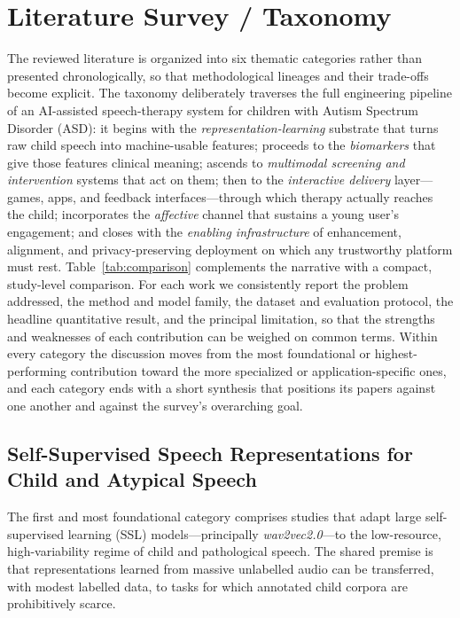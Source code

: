 \documentclass[conference]{IEEEtran}
\begin{document}
\section{Literature Survey / Taxonomy}
\label{sec:survey}
The reviewed literature is organized into six thematic categories rather than presented chronologically, so that methodological lineages and their trade-offs become explicit. The taxonomy deliberately traverses the full engineering pipeline of an AI-assisted speech-therapy system for children with Autism Spectrum Disorder (ASD): it begins with the \emph{representation-learning} substrate that turns raw child speech into machine-usable features; proceeds to the \emph{biomarkers} that give those features clinical meaning; ascends to \emph{multimodal screening and intervention} systems that act on them; then to the \emph{interactive delivery} layer---games, apps, and feedback interfaces---through which therapy actually reaches the child; incorporates the \emph{affective} channel that sustains a young user's engagement; and closes with the \emph{enabling infrastructure} of enhancement, alignment, and privacy-preserving deployment on which any trustworthy platform must rest. Table~\ref{tab:comparison} complements the narrative with a compact, study-level comparison. For each work we consistently report the problem addressed, the method and model family, the dataset and evaluation protocol, the headline quantitative result, and the principal limitation, so that the strengths and weaknesses of each contribution can be weighed on common terms. Within every category the discussion moves from the most foundational or highest-performing contribution toward the more specialized or application-specific ones, and each category ends with a short synthesis that positions its papers against one another and against the survey's overarching goal.

\subsection{Self-Supervised Speech Representations for Child and Atypical Speech}
The first and most foundational category comprises studies that adapt large self-supervised learning (SSL) models---principally \emph{wav2vec2.0}---to the low-resource, high-variability regime of child and pathological speech. The shared premise is that representations learned from massive unlabelled audio can be transferred, with modest labelled data, to tasks for which annotated child corpora are prohibitively scarce.
\end{document}
